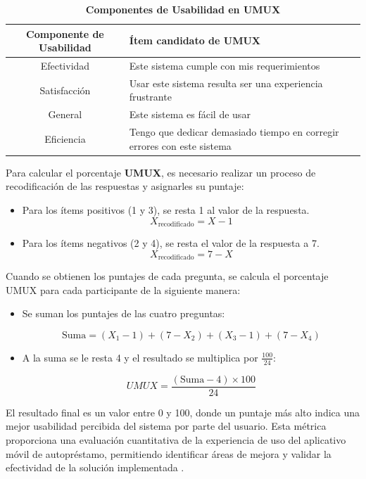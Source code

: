 \documentclass[spanish]{ieee_upb}
\begin{document}
\begin{table}[htpb]
    \centering
    \caption[Nombre en la lista de tablas]{\bfseries Componentes de Usabilidad en UMUX }
    \label{tabla:1}
   
    \begin{tabular}{|c|p{11cm}|} \hline 
         \textbf{Componente de Usabilidad}&  \textbf{Ítem candidato de UMUX}\\ \hline 
         Efectividad  & Este sistema cumple con mis requerimientos \\ \hline 
         Satisfacción &Usar este sistema resulta ser una experiencia frustrante \\ \hline 
         General      & Este sistema es fácil de usar \\ \hline
         Eficiencia   & Tengo que dedicar demasiado tiempo en corregir errores con este sistema \\ \hline
    \end{tabular}
   
    
\end{table}

Para calcular el porcentaje \textbf{UMUX}, es necesario realizar un proceso de recodificación de las respuestas y asignarles su puntaje:
\begin{itemize}
    \item Para los ítems positivos (1 y 3), se resta 1 al valor de la respuesta.
        \[
    X_{\text{recodificado}} = X - 1
    \]
    \item Para los ítems negativos (2 y 4), se resta el valor de la respuesta a 7.
        \[
    X_{\text{recodificado}} = 7 - X
    \]

\end{itemize}
Cuando se obtienen los puntajes de cada pregunta, se calcula el porcentaje UMUX para cada participante de la siguiente manera:

\begin{itemize}
    \item Se suman los puntajes de las cuatro preguntas:

    \[
    \text{Suma} = (X_1 - 1) + (7 - X_2) + (X_3 - 1) + (7 - X_4)
    \]

    \item A la suma se le resta 4 y el resultado se multiplica por \(\tfrac{100}{24}\):

    \begin{equation}
        UMUX = \frac{(\text{Suma} - 4) \times 100}{24}
        \label{eq:umux}
    \end{equation}
\end{itemize}
El resultado final es un valor entre 0 y 100, donde un puntaje más alto indica una mejor usabilidad percibida del sistema por parte del usuario. Esta métrica proporciona una evaluación cuantitativa de la experiencia de uso del aplicativo móvil de autopréstamo, permitiendo identificar áreas de mejora y validar la efectividad de la solución implementada \cite{umux}.
\end{document}
